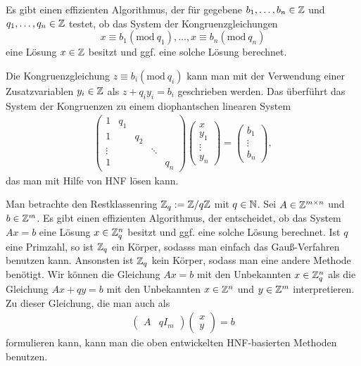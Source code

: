 	\begin{bem}
		Es gibt einen effizienten Algorithmus, der für gegebene $b_1,\ldots,b_n \in \mathbb Z$ und $q_1,\ldots,q_n \in \mathbb Z$ testet, ob das System der Kongruenzgleichungen 
		\[	
		x \equiv b_1 (\mathrm{mod} \ q_1), \ldots, x \equiv b_n (\mathrm{mod} \ q_n)
		\]
		eine Lösung $x \in \mathbb Z$ besitzt und ggf. eine solche Lösung berechnet. 
		
		Die Kongruenzgleichung $z \equiv b_i (\mathrm{mod} \ q_i)$ kann man mit der Verwendung einer Zusatzvariablen $y_i \in \mathbb Z$ als $z + q_i y_i = b_i$ geschrieben werden. Das überführt das System der Kongruenzen zu einem diophantschen linearen System 
		\begin{align*}
			\begin{pmatrix} 1 & q_1 &  &
				\\ 1 & & q_2 & 
				\\ \vdots & & & \ddots 
				\\ 1 & & & & q_n 
			\end{pmatrix} 
			\begin{pmatrix} x \\ y_1 \\ \vdots \\ y_n \end{pmatrix} 
			= 
			\begin{pmatrix} b_1 \\ \vdots \\ b_n \end{pmatrix},  
		\end{align*}
		das man mit Hilfe von HNF lösen kann. 
	\end{bem} 
	
	\begin{bem}
		Man betrachte den Restklassenring $ \mathbb Z_q  := \mathbb Z/ q \mathbb Z$ mit $q \in \mathbb N$. Sei $A \in \mathbb Z^{m \times n}$ und $b \in \mathbb Z^m$. Es gibt einen effizienten Algorithmus, der entscheidet, ob das System $A x = b$ eine Lösung $x \in \mathbb Z_q^n$ besitzt und ggf. eine solche Lösung berechnet. Ist $q$ eine Primzahl, so ist $\mathbb Z_q$ ein Körper, sodasss man einfach das Gauß-Verfahren benutzen kann. Ansonsten ist $\mathbb Z_q$ kein Körper, sodass man eine andere Methode benötigt. Wir können die Gleichung $A x = b$ mit den Unbekannten $x \in \mathbb Z_q^n$ als die Gleichung $A x + q y = b$ mit den Unbekannten $x \in \mathbb Z^n$ und $y \in \mathbb Z^m$ interpretieren. Zu dieser Gleichung, die man auch als
		\begin{align*}
			\begin{pmatrix} A & q I_m \end{pmatrix} \begin{pmatrix} x \\ y  \end{pmatrix}  = b
		\end{align*}
		formulieren kann, kann man die oben entwickelten HNF-basierten Methoden benutzen. 
	\end{bem} 
	
